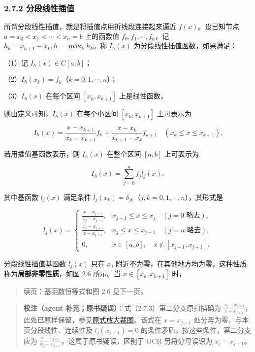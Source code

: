 \subsubsection{2.7.2 分段线性插值}\label{ch02b-ux5206ux6bb5ux7ebfux6027ux63d2ux503c}

所谓分段线性插值，就是将插值点用折线段连接起来逼近 \(f(x)\)。设已知节点 \(a=x_0<x_1<\cdots<x_n=b\) 上的函数值 \(f_0,f_1,\cdots,f_n\)，记 \(h_k=x_{k+1}-x_k,h=\max_k h_k\)。称 \(I_h(x)\) 为分段线性插值函数，如果满足：

（1）记 \(I_h(x)\in C[a,b]\)；

（2）\(I_h(x_k)=f_k\)（\(k=0,1,\cdots,n\)）；

（3）\(I_h(x)\) 在每个区间 \([x_k,x_{k+1}]\) 上是线性函数，

则由定义可知，\(I_h(x)\) 在每个小区间 \([x_k,x_{k+1}]\) 上可表示为

\[I_h(x)=\frac{x-x_{k+1}}{x_k-x_{k+1}}f_k+\frac{x-x_k}{x_{k+1}-x_k}f_{k+1}\quad(x_k\leqslant x\leqslant x_{k+1}).\tag{2.7.1}\]

若用插值基函数表示，则 \(I_h(x)\) 在整个区间 \([a,b]\) 上可表示为

\[I_h(x)=\sum_{j=0}^n f_jl_j(x),\tag{2.7.2}\]

其中基函数 \(l_j(x)\) 满足条件 \(l_j(x_k)=\delta_{jk}\)（\(j,k=0,1,\cdots,n\)），其形式是

\[l_j(x)=\begin{cases}
\displaystyle\frac{x-x_{j-1}}{x_j-x_{j-1}},&x_{j-1}\leqslant x\leqslant x_j\quad(j=0\text{ 略去}),\\[6pt]
\displaystyle\frac{x_j-x_{j+1}}{x-x_{j+1}},&x_j\leqslant x\leqslant x_{j+1}\quad(j=n\text{ 略去}),\\[6pt]
0,&x\in[a,b],\quad x\notin[x_{j-1},x_{j+1}].
\end{cases}\tag{2.7.3}\]

分段线性插值基函数 \(l_j(x)\) 只在 \(x_j\) 附近不为零，在其他地方均为零，这种性质称为\textbf{局部非零性质}，如图 2.6 所示。当 \(x\in[x_k,x_{k+1}]\) 时，

\begin{quote}
续页：基函数恒等式和图 2.6 见下一页。
\end{quote}

\begin{quote}
\textbf{校注（agent 补充；原书疑误）}：式（2.7.3）第二分支原扫描确为 \(\frac{x_j-x_{j+1}}{x-x_{j+1}}\)，此处已原样保留，参见\href{verified/assets/ch02b/pdf-046-eq-2-7-3-detail.png}{原式放大裁图}。该式在 \(x=x_{j+1}\) 处分母为零，与本页分段线性、连续性及 \(l_j(x_{j+1})=0\) 的条件矛盾。按这些条件，第二分支应为 \(\frac{x-x_{j+1}}{x_j-x_{j+1}}\)。这属于原书疑误，区别于 OCR 另将分母误识为 \(x_j-x_{j+1}\)。
\end{quote}

